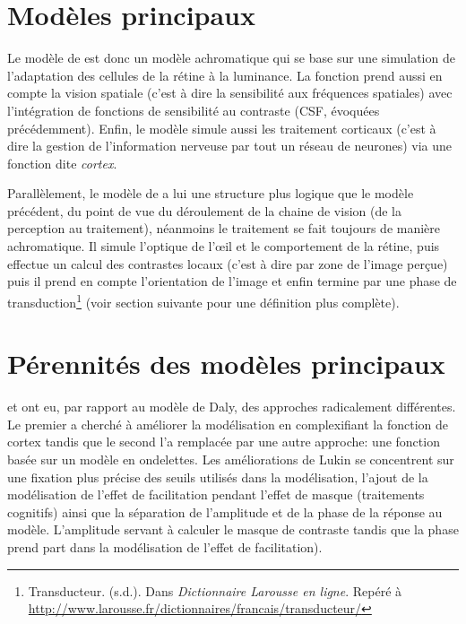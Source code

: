 	\section{Modèles principaux}
	\par Le modèle de \citep{daly_visible_1992} est donc un modèle achromatique qui se base sur une simulation de l'adaptation des cellules de la rétine à la luminance. La fonction prend aussi en compte la vision spatiale (c'est à dire la sensibilité aux fréquences spatiales) avec l'intégration de fonctions de sensibilité au contraste (CSF, évoquées précédemment). Enfin, le modèle simule aussi les traitement corticaux (c'est à dire la gestion de l'information nerveuse par tout un réseau de neurones) via une fonction dite \textit{cortex}.
		
	\par Parallèlement, le modèle de \citep{lubin_visual_1995} a lui une structure plus logique que le modèle précédent, du point de vue du déroulement de la chaine de vision (de la perception au traitement), néanmoins le traitement se fait toujours de manière achromatique. Il simule l'optique de l'œil et le comportement de la rétine, puis effectue un calcul des contrastes locaux (c'est à dire par zone de l'image perçue) puis il prend en compte l'orientation de l'image et enfin termine par une phase de transduction\footnote{Transducteur. (s.d.). Dans \textit{Dictionnaire Larousse en ligne}. Repéré à \url{http://www.larousse.fr/dictionnaires/francais/transducteur/}} (voir section suivante pour une définition plus complète).
	
	\section{Pérennités des modèles principaux}
	\par \citep{lukin_improved_2009} et \citep{bradley_wavelet_1999} ont eu, par rapport au modèle de Daly, des approches radicalement différentes. Le premier a cherché à améliorer la modélisation en complexifiant la fonction de cortex tandis que le second l'a remplacée par une autre approche: une fonction basée sur un modèle en ondelettes.
	Les améliorations de Lukin se concentrent sur une fixation plus précise des seuils utilisés dans la modélisation, l'ajout de la modélisation de l'effet de facilitation pendant l'effet de masque (traitements cognitifs) ainsi que la séparation de l'amplitude et de la phase de la réponse au modèle. L'amplitude servant à calculer le masque de contraste tandis que la phase prend part dans la modélisation de l'effet de facilitation).
	
